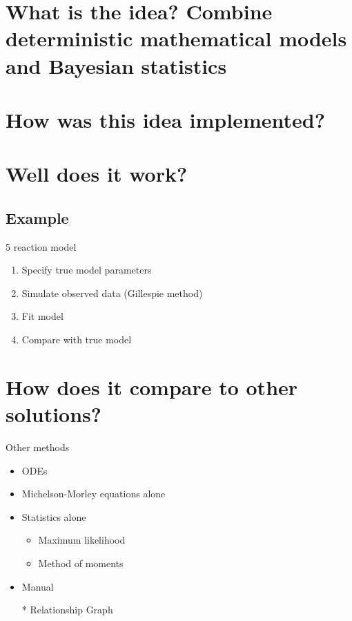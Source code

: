 \documentclass{beamer}
\begin{document}
\section{What is the {idea}? Combine deterministic mathematical models
  and Bayesian statistics}
\section{How was this idea implemented?}

\section{Well does it work?}

\subsection{Example}

5 reaction model
\begin{enumerate}
\item Specify true model parameters
\item Simulate observed data (Gillespie method)
\item Fit model
\item Compare with true model
\end{enumerate}

\section{How does it compare to other solutions?}

Other methods
\begin{itemize}
\item ODEs
\item Michelson-Morley equations alone
\item Statistics alone
  \begin{itemize}
  \item Maximum likelihood
  \item Method of moments
  \end{itemize}
\item Manual
\item[*] Relationship Graph
\end{itemize}
\end{document}
